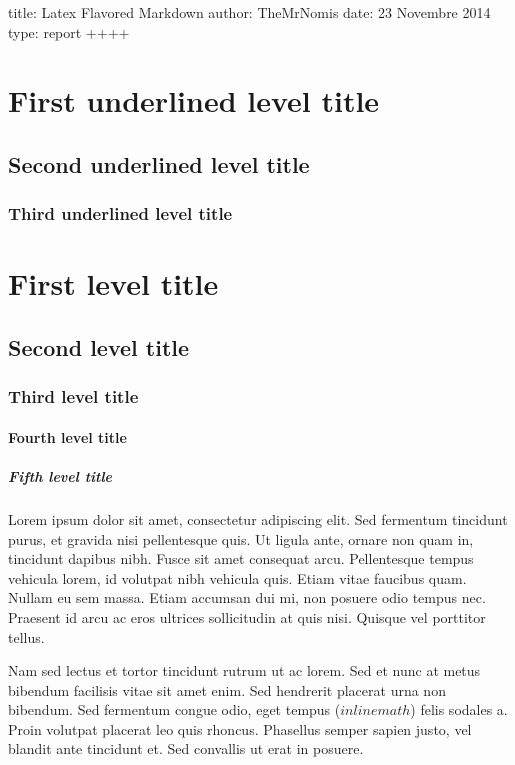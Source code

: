 title: Latex Flavored Markdown
author: TheMrNomis
date: 23 Novembre 2014
type: report
++++

\section{First underlined level title}

\subsection{Second underlined level title}

\subsubsection{Third underlined level title}

\section{First level title}

\subsection{Second level title}

\subsubsection{Third level title}

\paragraph{Fourth level title}

\subparagraph{Fifth level title}

Lorem ipsum dolor sit amet, consectetur adipiscing elit. Sed fermentum tincidunt purus, et gravida nisi pellentesque quis. Ut ligula ante, ornare non quam in, tincidunt dapibus nibh. Fusce sit amet consequat arcu. Pellentesque tempus vehicula lorem, id volutpat nibh vehicula quis. Etiam vitae faucibus quam. Nullam eu sem massa. Etiam accumsan dui mi, non posuere odio tempus nec. Praesent id arcu ac eros ultrices sollicitudin at quis nisi. Quisque vel porttitor tellus.

Nam sed lectus et tortor tincidunt rutrum ut ac lorem. Sed et nunc at metus bibendum facilisis vitae sit amet enim. Sed hendrerit placerat urna non bibendum. Sed fermentum congue odio, eget tempus ($inline math$) felis sodales a. Proin volutpat placerat leo quis rhoncus. Phasellus semper sapien justo, vel blandit ante tincidunt et. Sed convallis ut erat in posuere.

